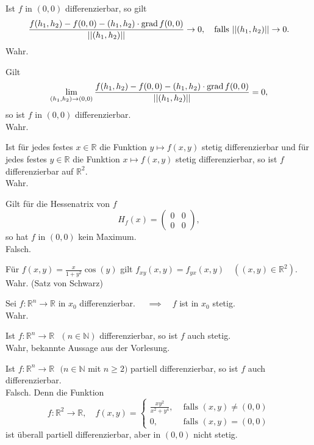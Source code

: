 Ist $f$ in $(0,0)$ differenzierbar, so gilt
\begin{displaymath}
  \frac{f(h_1, h_2) - f(0,0) - (h_1,h_2) \cdot \operatorname{grad} f(0,0)}{||(h_1, h_2)||} \to 0, \quad \text{falls } ||(h_1, h_2)|| \to 0.
\end{displaymath}
Wahr.

Gilt
\begin{displaymath}
  \lim_{(h_1, h_2) \to (0,0)} \frac{f(h_1, h_2) - f(0,0) - (h_1,h_2) \cdot \operatorname{grad} f(0,0)}{||(h_1, h_2)||} = 0,
\end{displaymath}
so ist $f$ in $(0,0)$ differenzierbar.\\
Wahr.

Ist für jedes festes $x\in \mathbb{R}$ die Funktion $y \mapsto f(x,y)$ stetig differenzierbar und für jedes festes $y \in \mathbb{R}$ die Funktion $x \mapsto f(x,y)$ stetig differenzierbar, so ist $f$ differenzierbar auf $\mathbb{R}^2$.\\
Wahr.

Gilt für die Hessenatrix von $f$
\begin{displaymath}
  H_f(x) = \begin{pmatrix} 0 & 0 \\ 0 & 0\end{pmatrix},
\end{displaymath}
so hat $f$ in $(0,0)$ kein Maximum.\\
Falsch.

Für $f(x,y) = \frac{x}{1 +y^2} \cos(y)$ gilt $f_{xy}(x,y) = f_{yx}(x,y) \quad ((x,y) \in \mathbb{R}^2)$.\\
Wahr. (Satz von Schwarz)

Sei $f : \mathbb{R}^n \to \mathbb{R}$ in $x_0$ differenzierbar. $\quad \implies \quad f$ ist in $x_0$ stetig.\\
Wahr.

Ist $f : \mathbb{R}^n \to \mathbb{R} \text{ } (n \in \mathbb{N})$ differenzierbar, so ist $f$ auch stetig.\\
Wahr, bekannte Aussage aus der Vorlesung.

Ist $f : \mathbb{R}^n \to \mathbb{R} \text{ } (n \in \mathbb{N}$ mit $n \geq 2)$ partiell differenzierbar, so ist $f$ auch differenzierbar.\\
Falsch.
Denn die Funktion
\begin{displaymath}
  f : \mathbb{R}^2 \to \mathbb{R}, \quad f(x,y) =
  \begin{cases}
    \frac{xy^2}{x^2+y^4},& \text{ falls } (x,y) \neq (0,0)\\
    0,& \text{ falls } (x,y) = (0,0)
  \end{cases}
\end{displaymath}
ist überall partiell differenzierbar, aber in $(0,0)$ nicht stetig.


